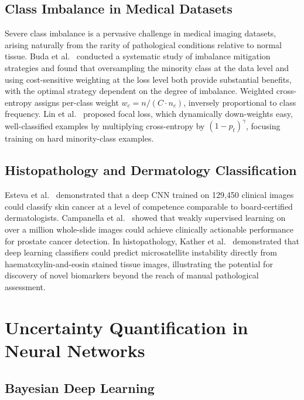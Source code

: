 \subsection{Class Imbalance in Medical Datasets}

Severe class imbalance is a pervasive challenge in medical imaging datasets, arising naturally from the rarity of pathological conditions relative to normal tissue. Buda et al.~\cite{buda2018systematic} conducted a systematic study of imbalance mitigation strategies and found that oversampling the minority class at the data level and using cost-sensitive weighting at the loss level both provide substantial benefits, with the optimal strategy dependent on the degree of imbalance. Weighted cross-entropy assigns per-class weight $w_c = n / (C \cdot n_c)$, inversely proportional to class frequency. Lin et al.~\cite{lin2017focal} proposed focal loss, which dynamically down-weights easy, well-classified examples by multiplying cross-entropy by $(1 - p_t)^\gamma$, focusing training on hard minority-class examples.

\subsection{Histopathology and Dermatology Classification}

Esteva et al.~\cite{esteva2017dermatologist} demonstrated that a deep CNN trained on 129,450 clinical images could classify skin cancer at a level of competence comparable to board-certified dermatologists. Campanella et al.~\cite{campanella2019clinical} showed that weakly supervised learning on over a million whole-slide images could achieve clinically actionable performance for prostate cancer detection. In histopathology, Kather et al.~\cite{kather2019predicting} demonstrated that deep learning classifiers could predict microsatellite instability directly from haematoxylin-and-eosin stained tissue images, illustrating the potential for discovery of novel biomarkers beyond the reach of manual pathological assessment.

\section{Uncertainty Quantification in Neural Networks}

\subsection{Bayesian Deep Learning}


